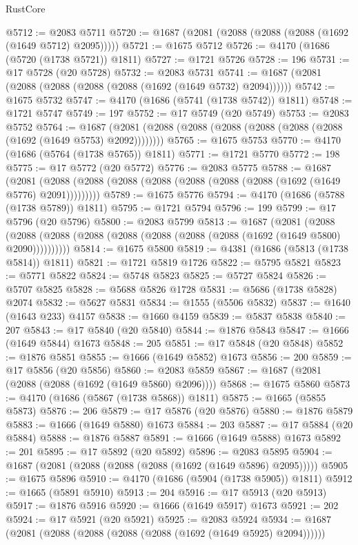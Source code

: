 \begin{lexlean}{RustCore}
\begin{coremodule}
@5712 := @2083 @5711
@5720 := @1687 (@2081 (@2088 (@2088 (@2088 (@1692 (@1649 @5712) @2095)))))
@5721 := @1675 @5712
@5726 := @4170 (@1686 (@5720 (@1738 @5721)) @1811)
@5727 := @1721 @5726
@5728 := 196
@5731 := @17 @5728 (@20 @5728)
@5732 := @2083 @5731
@5741 := @1687 (@2081 (@2088 (@2088 (@2088 (@2088 (@1692 (@1649 @5732) @2094))))))
@5742 := @1675 @5732
@5747 := @4170 (@1686 (@5741 (@1738 @5742)) @1811)
@5748 := @1721 @5747
@5749 := 197
@5752 := @17 @5749 (@20 @5749)
@5753 := @2083 @5752
@5764 := @1687 (@2081 (@2088 (@2088 (@2088 (@2088 (@2088 (@2088 (@1692 (@1649 @5753) @2092))))))))
@5765 := @1675 @5753
@5770 := @4170 (@1686 (@5764 (@1738 @5765)) @1811)
@5771 := @1721 @5770
@5772 := 198
@5775 := @17 @5772 (@20 @5772)
@5776 := @2083 @5775
@5788 := @1687
    (@2081 (@2088 (@2088 (@2088 (@2088 (@2088 (@2088 (@2088 (@1692 (@1649 @5776) @2091)))))))))
@5789 := @1675 @5776
@5794 := @4170 (@1686 (@5788 (@1738 @5789)) @1811)
@5795 := @1721 @5794
@5796 := 199
@5799 := @17 @5796 (@20 @5796)
@5800 := @2083 @5799
@5813 := @1687
    (@2081
      (@2088 (@2088 (@2088 (@2088 (@2088 (@2088 (@2088 (@2088 (@1692 (@1649 @5800) @2090))))))))))
@5814 := @1675 @5800
@5819 := @4381 (@1686 (@5813 (@1738 @5814)) @1811)
@5821 := @1721 @5819 @1726
@5822 := @5795 @5821
@5823 := @5771 @5822
@5824 := @5748 @5823
@5825 := @5727 @5824
@5826 := @5707 @5825
@5828 := @5688 @5826 @1728
@5831 := @5686 (@1738 @5828) @2074
@5832 := @5627 @5831
@5834 := @1555 (@5506 @5832)
@5837 := @1640 (@1643 @233) @4157
@5838 := @1660 @4159
@5839 := @5837 @5838
@5840 := 207
@5843 := @17 @5840 (@20 @5840)
@5844 := @1876 @5843
@5847 := @1666 (@1649 @5844) @1673
@5848 := 205
@5851 := @17 @5848 (@20 @5848)
@5852 := @1876 @5851
@5855 := @1666 (@1649 @5852) @1673
@5856 := 200
@5859 := @17 @5856 (@20 @5856)
@5860 := @2083 @5859
@5867 := @1687 (@2081 (@2088 (@2088 (@1692 (@1649 @5860) @2096))))
@5868 := @1675 @5860
@5873 := @4170 (@1686 (@5867 (@1738 @5868)) @1811)
@5875 := @1665 (@5855 @5873)
@5876 := 206
@5879 := @17 @5876 (@20 @5876)
@5880 := @1876 @5879
@5883 := @1666 (@1649 @5880) @1673
@5884 := 203
@5887 := @17 @5884 (@20 @5884)
@5888 := @1876 @5887
@5891 := @1666 (@1649 @5888) @1673
@5892 := 201
@5895 := @17 @5892 (@20 @5892)
@5896 := @2083 @5895
@5904 := @1687 (@2081 (@2088 (@2088 (@2088 (@1692 (@1649 @5896) @2095)))))
@5905 := @1675 @5896
@5910 := @4170 (@1686 (@5904 (@1738 @5905)) @1811)
@5912 := @1665 (@5891 @5910)
@5913 := 204
@5916 := @17 @5913 (@20 @5913)
@5917 := @1876 @5916
@5920 := @1666 (@1649 @5917) @1673
@5921 := 202
@5924 := @17 @5921 (@20 @5921)
@5925 := @2083 @5924
@5934 := @1687 (@2081 (@2088 (@2088 (@2088 (@2088 (@1692 (@1649 @5925) @2094))))))

\end{coremodule}
\end{lexlean}
